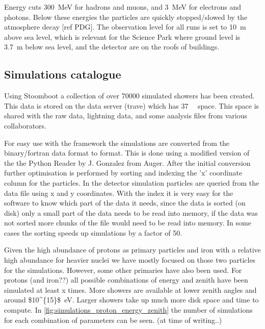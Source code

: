 Energy cuts \SI{300}{\mega\electronvolt} for hadrons and muons, and
\SI{3}{\mega\electronvolt} for electrons and photons. Below these
energies the particles are quickly stopped/slowed by the atmosphere
decay [ref PDG]. The observation level for all runs is set to
\SI{10}{\meter} above sea level, which is relevant for the Science Park
where ground level is \SI{3.7}{\meter} below sea level, and the detector
are on the roofs of buildings.


\subsection{Simulations catalogue}

Using Stoomboot a collection of over \num{70000} simulated showers has
been created. This data is stored on the \hisparc data server (trave)
which has \SI{37}{\tera\byte} space. This space is shared with the raw
\hisparc data, \knmi lightning data, and some analysis files from
various \hisparc collaborators.

For easy use with the \sapphire framework the \corsika simulations are
converted from the binary/fortran data format to \hdf format. This is
done using a modified version of the the Python \corsika Reader by J.
Gonzalez from Auger. After the initial conversion further optimisation
is performed by sorting and indexing the 'x' coordinate column for the
particles. In the detector simulation particles are queried from the
\corsika data file using x and y coordinates. With the index it is very
easy for the software to know which part of the data it needs, since the
data is sorted (on disk) only a small part of the data needs to be read
into memory, if the data was not sorted more chunks of the file would
need to be read into memory. In some cases the sorting speeds up
simulations by a factor of 50.

Given the high abundance of protons as primary particles and iron with a
relative high abundance for heavier nuclei we have mostly focused on
those two particles for the simulations. However, some other primaries
have also been used. For protons (and iron??) all possible combinations
of energy and zenith have been simulated at least x times. More showers
are available at lower zenith angles and around
\SI{$10^{15}$}{\electronvolt}. Larger showers take up much more disk
space and time to compute. In \ref{fig:simulations_proton_energy_zenith}
the number of simulations for each combination of parameters can be seen.
(at time of writing..)

